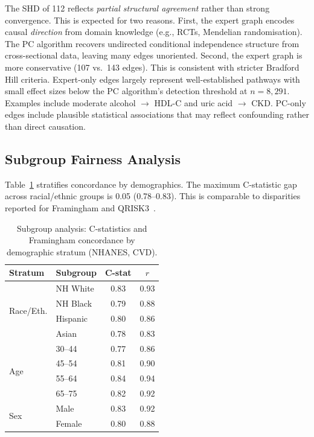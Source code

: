 \documentclass[runningheads]{llncs}
\begin{document}
The SHD of 112 reflects \emph{partial structural agreement} rather
than strong convergence.
This is expected for two reasons.
First, the expert graph encodes causal \emph{direction} from domain
knowledge (e.g., RCTs, Mendelian randomisation).
The PC algorithm recovers undirected conditional independence
structure from cross-sectional data, leaving many edges unoriented.
Second, the expert graph is more conservative (107 vs.\ 143 edges).
This is consistent with stricter Bradford Hill criteria.
Expert-only edges largely represent well-established pathways with
small effect sizes below the PC algorithm's detection threshold at
$n = 8{,}291$.
Examples include moderate alcohol $\rightarrow$ HDL-C and
uric acid $\rightarrow$ CKD\@.
PC-only edges include plausible statistical associations that may
reflect confounding rather than direct causation.

\subsection{Subgroup Fairness Analysis}\label{sec:subgroup}

Table~\ref{tab:subgroup} stratifies concordance by demographics.
The maximum C-statistic gap across racial/ethnic groups is 0.05
(0.78--0.83).
This is comparable to disparities reported for Framingham and
QRISK3~\cite{hippisley2017qrisk3}.

\renewcommand{\arraystretch}{1.2}
\begin{table}[t]
\centering
\caption{Subgroup analysis: C-statistics and Framingham concordance
by demographic stratum (NHANES, CVD).}
\label{tab:subgroup}
\small
\begin{tabular}{@{}llcc@{}}
\toprule
\textbf{Stratum} & \textbf{Subgroup} & \textbf{C-stat} & \textbf{$r$} \\
\midrule
\multirow{4}{*}{Race/Eth.}
  & NH White  & 0.83 & 0.93 \\
  & NH Black  & 0.79 & 0.88 \\
  & Hispanic  & 0.80 & 0.86 \\
  & Asian     & 0.78 & 0.83 \\
\midrule
\multirow{4}{*}{Age}
  & 30--44    & 0.77 & 0.86 \\
  & 45--54    & 0.81 & 0.90 \\
  & 55--64    & 0.84 & 0.94 \\
  & 65--75    & 0.82 & 0.92 \\
\midrule
\multirow{2}{*}{Sex}
  & Male      & 0.83 & 0.92 \\
  & Female    & 0.80 & 0.88 \\
\bottomrule
\end{tabular}
\end{table}
\renewcommand{\arraystretch}{1.0}
\end{document}
